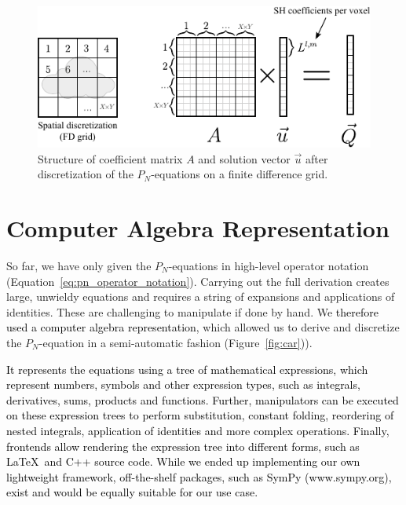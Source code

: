 \documentclass{egpubl}
\newcommand{\icaption}[1]{\caption{#1}}
\newcommand{\rev}[1]{\textcolor{black}{#1}}
\newcommand{\nocontentsline}[3]{}
\newcommand{\tocless}[2]{\bgroup\let\addcontentsline=\nocontentsline#1{#2}\egroup}
\begin{document}
\begin{figure}[t]
\centering
\includegraphics[width=\columnwidth]{fig_matrix_layout_small.pdf}
\vspace{-0.3in}
\icaption{Structure of coefficient matrix $A$ and solution vector $\vec{u}$ after discretization of the $P_N$-equations on a finite difference grid.}
\label{fig:matrix_layout}
\end{figure}

\tocless\section{Computer Algebra Representation \label{sec:car}}

So far, we have only given the $P_N$-equations in high-level operator notation (Equation~\ref{eq:pn_operator_notation}). Carrying out the full derivation creates large, unwieldy equations and requires a string of expansions and applications of identities. These are challenging to manipulate if done by hand. We \rev{therefore used a computer algebra representation}, which allowed us to derive and discretize the $P_N$-equation in a semi-automatic fashion (Figure~\ref{fig:car})).

\rev{It represents the equations using a tree of mathematical expressions, which represent numbers, symbols and other expression types, such as integrals, derivatives, sums, products and functions. Further, manipulators can be executed on these expression trees to perform substitution, constant folding, reordering of nested integrals, application of identities and more complex operations. Finally, frontends allow rendering the expression tree into different forms, such as \LaTeX~and C++ source code. While we ended up implementing our own lightweight framework, off-the-shelf packages, such as SymPy (www.sympy.org), exist and would be equally suitable for our use case.}
\end{document}
